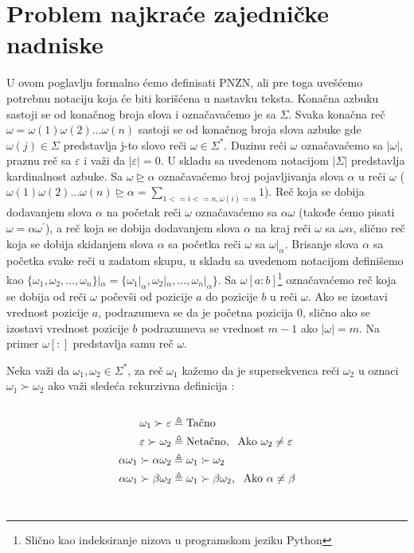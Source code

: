 \documentclass[12pt,oneside]{memoir}
\begin{document}
\section{Problem najkraće zajedničke nadniske}
U ovom poglavlju formalno ćemo definisati PNZN, ali pre toga uvešćemo potrebnu notaciju koja će biti korišćena u nastavku
teksta. Konačna azbuku sastoji se od konačnog broja slova i označavaćemo je sa $\Sigma$. Svaka konačna reč
$\omega=\omega(1)\omega(2)...\omega(n)$ sastoji se od konačnog broja slova azbuke gde $\omega(j)\in\Sigma$ predstavlja j-to slovo reči $\omega\in\Sigma^*$.
Duzinu reči $\omega$ označavaćemo sa $|\omega|$, praznu reč sa $\varepsilon$ i važi da $|\varepsilon|=0$. U skladu sa uvedenom
notacijom $|\Sigma|$ predstavlja kardinalnost azbuke. Sa $\omega\unrhd\alpha$ označavaćemo broj pojavljivanja slova $\alpha$
u reči $\omega$ ($\omega(1)\omega(2)...\omega(n)\unrhd\alpha=\sum_{1<=i<=n,\omega(i)=\alpha}1$). Reč koja se dobija dodavanjem
slova $\alpha$ na početak reči $\omega$ označavaćemo sa $\alpha\omega$ (takođe ćemo pisati $\omega=\alpha\omega^{'}$),
a reč koja se dobija dodavanjem slova $\alpha$ na kraj reči $\omega$ sa $\omega\alpha$, slično reč koja se dobija skidanjem slova $\alpha$ sa početka
reči $\omega$ sa $\omega|_{\alpha}$. Brisanje slova $\alpha$ sa početka svake reči u zadatom skupu, u skladu sa uvedenom notacijom
definišemo kao $\{\omega_{1},\omega_{2},...,\omega_{n}\}|_{\alpha}=\{\omega_{1}|_{\alpha},\omega_{2}|_{\alpha},...,\omega_{n}|_{\alpha}\}$.
Sa $\omega[a:b]$\footnote{Slično kao indeksiranje nizova u programskom jeziku Python} označavaćemo reč koja se dobija od
reči $\omega$ počevši od pozicije $a$ do pozicije $b$ u reči $\omega$. Ako se izostavi vrednost pozicije $a$, podrazumeva se
da je početna pozicija 0, slično ako se izostavi vrednost pozicije $b$ podrazumeva se vrednost $m-1$ ako $|\omega|=m$.
Na primer $\omega[:]$ predstavlja samu reč $\omega$.

Neka važi da $\omega_{1},\omega_{2}\in\Sigma^*$, za reč $\omega_{1}$ kažemo da je
supersekvenca reči $\omega_{2}$ u oznaci $\omega_{1}\succ\omega_{2}$ ako važi sledeća rekurzivna definicija \cite{ProbabilisticBS}:
\\
\\
\begin{equation}
\begin{aligned}
\omega_{1}\succ\varepsilon &\triangleq \textrm{Tačno}\\
\varepsilon\succ\omega_{2} &\triangleq \textrm{Netačno, \:\:Ako } \omega_{2}\neq\varepsilon\\
\alpha\omega_{1}\succ\alpha\omega_{2} &\triangleq \omega_{1}\succ\omega_{2}\\
\alpha\omega_{1}\succ\beta\omega_{2} &\triangleq \omega_{1}\succ\beta\omega_{2} \textrm{, \:\:Ako } \alpha\neq\beta
\end{aligned}
\end{equation}
\\
\end{document}
